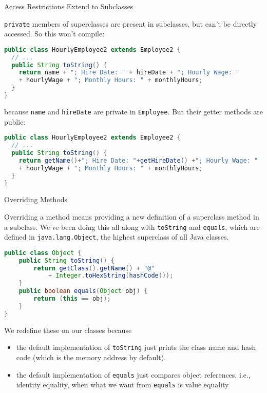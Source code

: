 \documentclass{beamer}
\begin{document}
\begin{frame}[fragile]{Access Restrictions Extend to Subclasses}


{\tt private} members of superclasses are present in subclasses, but can't be directly accessed.  So this won't compile:
\vspace{-.05in}
\begin{lstlisting}[language=Java]
public class HourlyEmployee2 extends Employee2 {
  // ...
  public String toString() {
    return name + "; Hire Date: " + hireDate + "; Hourly Wage: "
    + hourlyWage + "; Monthly Hours: " + monthlyHours;
  }
}
\end{lstlisting}
because {\tt name} and {\tt hireDate} are private in {\tt Employee}.  But their getter methods are public:
\vspace{-.05in}
\begin{lstlisting}[language=Java]
public class HourlyEmployee2 extends Employee2 {
  // ...
  public String toString() {
    return getName()+"; Hire Date: "+getHireDate() +"; Hourly Wage: "
    + hourlyWage + "; Monthly Hours: " + monthlyHours;
  }
}
\end{lstlisting}


\end{frame}

\begin{frame}[fragile]{Overriding Methods}

\vspace{-.05in}
Overriding a method means providing a new definition of a superclass method in a subclass.  We've been doing this all along with {\tt toString} and {\tt equals}, which are defined in {\tt java.lang.Object}, the highest superclass of all Java classes.
\vspace{-.05in}
\begin{lstlisting}[language=Java]
public class Object {
    public String toString() {
        return getClass().getName() + "@"
            + Integer.toHexString(hashCode());
    }
    public boolean equals(Object obj) {
        return (this == obj);
    }
}
\end{lstlisting}
\vspace{-.1in}
We redefine these on our classes because
\begin{itemize}
\item the default implementation of {\tt toString} just prints the class name and hash code (which is the memory address by default).
\item the default implementation of {\tt equals} just compares object references, i.e., identity equality, when what we want from {\tt equals} is value equality
\end{itemize}


\end{frame}
\end{document}

